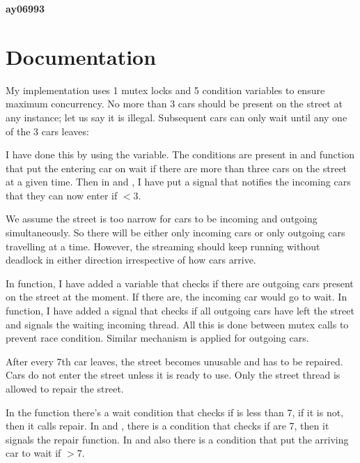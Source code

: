 \documentclass{article}
\begin{document}

\setcounter{page}{1}
\begin{center}
    \textbf{\large{ay06993}}
\end{center}
{} %


\section{Documentation}
My implementation uses 1 mutex locks and 5 condition variables to ensure
maximum concurrency. No more than 3 cars should be present on the street at any
instance; let us say it is illegal. Subsequent cars can only wait until any one
of the 3 cars leaves:

I have done this by using the  variable. The
conditions are present in  and  function that put
the entering car on wait if there are more than three cars on the street at a
given time. Then in  and , I have put a signal that
notifies the incoming cars that they can now enter if 
$< 3$.

We assume the street is too narrow for cars to be incoming and outgoing
simultaneously. So there will be either only incoming cars or only outgoing
cars travelling at a time. However, the streaming should keep running without
deadlock in either direction irrespective of how cars arrive.

In  function, I have added a variable that checks if
there are outgoing cars present on the street at the moment. If there are, the
incoming car would go to wait. In  function, I have
added a signal that checks if all outgoing cars have left the street and
signals the waiting incoming thread. All this is done between mutex calls to
prevent race condition. Similar mechanism is applied for outgoing cars.

After every 7th car leaves, the street becomes unusable and has to be repaired.
Cars do not enter the street unless it is ready to use. Only the street thread
is allowed to repair the street.

In the  function there's a wait condition that checks
if  is less than 7, if it is not, then it calls repair. In
 and , there is a condition
that checks if  are 7, then it signals the repair function. In
 and  also there is a
condition that put the arriving car to wait if  $>7$.
\end{document}
